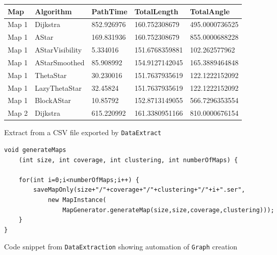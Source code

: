 \documentclass[12pt,notitlepage]{report}
\begin{document}
\begin{figure}
\centering
    \begin{tabular}{| l | l | l | l | l |}
    \hline
    Map & Algorithm & PathTime & TotalLength & TotalAngle\\ \hline %
     Map 1 & Dijkstra & 852.926976 & 160.752308679 & 495.0000736525\\ \hline %
     Map 1 & AStar & 169.831936 & 160.752308679 & 855.0000688228\\ \hline %
     Map 1 & AStarVisibility & 5.334016 & 151.6768359881 & 102.262577962\\ \hline %
Map 1 & AStarSmoothed & 85.908992 & 154.9127142045 & 165.3889464848\\ \hline %
Map 1 & ThetaStar & 30.230016 & 151.7637935619 & 122.1222152092\\ \hline %
Map 1 & LazyThetaStar & 32.45824 & 151.7637935619 & 122.1222152092\\ \hline %
Map 1 & BlockAStar & 10.85792 & 152.8713149055 & 566.7296353554\\ \hline %
Map 2 & Dijkstra & 615.220992 & 161.3380951166 & 810.0000676154\\ \hline %
 \end{tabular}
\caption{Extract from a CSV file exported by {\tt DataExtract}}
\end{figure}

\begin{figure}
\begin{lstlisting}
void generateMaps 
	(int size, int coverage, int clustering, int numberOfMaps) {
	
	for(int i=0;i<numberOfMaps;i++) {
		saveMapOnly(size+"/"+coverage+"/"+clustering+"/"+i+".ser",
			new MapInstance(
				MapGenerator.generateMap(size,size,coverage,clustering)));
	}
}
\end{lstlisting}
\caption{Code snippet from {\tt DataExtraction} showing automation of {\tt Graph} creation}
\end{figure}
\end{document}
